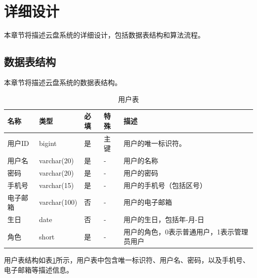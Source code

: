 \section{详细设计}

本章节将描述云盘系统的详细设计，包括数据表结构和算法流程。

\subsection{数据表结构}

本章节将描述云盘系统的数据表结构。

\begin{table}[!ht]
    \centering
    \caption{用户表}
    \label{table:user}
    {
        \begin{tabularx}{1.0\textwidth}{|p{1.5cm}|p{2cm}|p{0.5cm}|p{1cm}|X|}
            
            \hline
            名称 & 类型 & 必填 & 特殊 & 描述  \\ 
            \hline
            用户ID & bigint & 是 & 主键 & 用户的唯一标识符。  \\ 
            用户名 & varchar(20) & 是 & - & 用户的名称  \\ 
            密码 & varchar(20) & 是 & - & 用户的密码  \\ 
            手机号 & varchar(15) & 是 & - & 用户的手机号（包括区号）  \\ 
            电子邮箱 & varchar(100) & 否 & - & 用户的电子邮箱  \\ 
            生日 & date & 否 & - & 用户的生日，包括年-月-日  \\ 
            角色 & short & 是 & - & 用户的角色，0表示普通用户，1表示管理员用户  \\ 
            \hline
        \end{tabularx}
    }
\end{table}

用户表结构如表\ref{table:user}所示，用户表中包含唯一标识符、用户名、密码，以及手机号、电子邮箱等描述信息。

